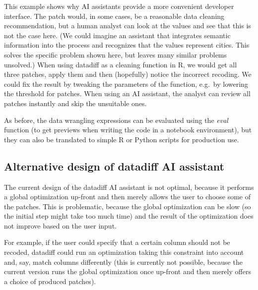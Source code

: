 \documentclass{article}
\begin{document}
This example shows why AI assistants provide a more convenient developer interface. The 
patch would, in some cases, be a reasonable data cleaning recommendation, but a human analyst can
look at the values and see that this is not the case here. (We could imagine an assistant that
integrates semantic information into the process and recognizes that the values represent cities.
This solves the specific problem shown here, but leaves many similar problems unsolved.) When using
datadiff as a cleaning function in R, we would get all three patches, apply them and then (hopefully)
notice the incorrect recoding. We could fix the result by tweaking the parameters of the function,
e.g.~by lowering the threshold for  patches. When using an AI assistant, the analyst
can review all patches instantly and skip the unsuitable ones. 

As before, the data wrangling expressions can be evaluated using the \emph{eval} function (to get 
previews when writing the code in a notebook environment), but they can also be translated to 
simple R or Python scripts for production use.

\subsection{Alternative design of datadiff AI assistant}
\label{sec:examples-datadiff2}


The current design of the datadiff AI assistant is not optimal, because it performs a global
optimization up-front and then merely allows the user to choose some of the patches. This is 
problematic, because the global optimization can be slow (so the initial step might take too
much time) and the result of the optimization does not improve based on the user input.

For example, if the user could specify that a certain column should not be recoded, datadiff 
could run an optimization taking this constraint into account and, say, match columns differently 
(this is currently not possible, because the current version runs the global optimization once 
up-front and then merely offers a choice of produced patches).
\end{document}
